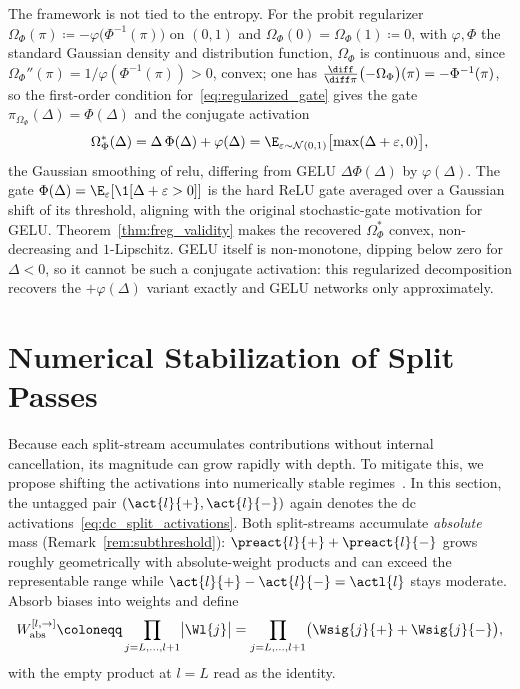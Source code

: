 \begin{remark}\label{rem:probit_gelu}
The framework is not tied to the entropy. For the probit regularizer $\Omega_\Phi(\pi) \coloneqq -\varphi\bigl(\Phi^{-1}(\pi)\bigr)$ on $(0,1)$ and $\Omega_\Phi(0)=\Omega_\Phi(1)\coloneqq0$, with $\varphi, \Phi$ the standard Gaussian density and distribution function, $\Omega_\Phi$ is continuous and, since $\Omega_\Phi''(\pi)=1/\varphi(\Phi^{-1}(\pi))>0$, convex; one has $\frac{\diff}{\diff \pi}\bigl(-\Omega_\Phi\bigr)(\pi) = -\Phi^{-1}(\pi)$, so the first-order condition for~\eqref{eq:regularized_gate} gives the gate $\pi_{\Omega_\Phi}(\Delta) = \Phi(\Delta)$ and the conjugate activation
\begin{equation*}
	\Omega_\Phi^*(\Delta) = \Delta\, \Phi(\Delta) + \varphi(\Delta) = \E_{\varepsilon \sim \mathcal{N}(0,1)}\bigl[ \max(\Delta + \varepsilon, 0) \bigr],
\end{equation*}
the Gaussian smoothing of \ac{relu}, differing from GELU $\Delta\Phi(\Delta)$ \parencite{Hendrycks2016} by $\varphi(\Delta)$. The gate $\Phi(\Delta)=\E_\varepsilon[\1[\Delta+\varepsilon>0]]$ is the hard ReLU gate averaged over a Gaussian shift of its threshold, aligning with the original stochastic-gate motivation for GELU. Theorem~\ref{thm:freg_validity} makes the recovered $\Omega_\Phi^*$ convex, non-decreasing and $1$-Lipschitz. GELU itself is non-monotone, dipping below zero for $\Delta<0$, so it cannot be such a conjugate activation: this regularized decomposition recovers the $+\varphi(\Delta)$ variant exactly and GELU networks only approximately.
\end{remark}

\section{Numerical Stabilization of Split Passes}\label{sec:stabilization_dc}

Because each split-stream accumulates contributions without internal cancellation, its magnitude can grow rapidly with depth. To mitigate this, we propose shifting the activations into numerically stable regimes~\parencite{hiddenMono}. In this section, the untagged pair $(\act{l}{+},\act{l}{-})$ again denotes the \ac{dc} activations~\eqref{eq:dc_split_activations}. Both split-streams accumulate \emph{absolute} mass (Remark~\ref{rem:subthreshold}): $\preact{l}{+}+\preact{l}{-}$ grows roughly geometrically with absolute-weight products and can exceed the representable range while $\act{l}{+}-\act{l}{-}=\actl{l}$ stays moderate. Absorb biases into weights and define
\begin{equation}
	W_{\mathrm{abs}}^{[l, \rightarrow]} \coloneqq \prod_{j = L, \dots, l+1} \bigl| \Wl{j} \bigr|
	= \prod_{j = L, \dots, l+1} \bigl( \Wsig{j}{+} + \Wsig{j}{-} \bigr),
	\label{eq:w_abs}
\end{equation}
with the empty product at $l = L$ read as the identity.

